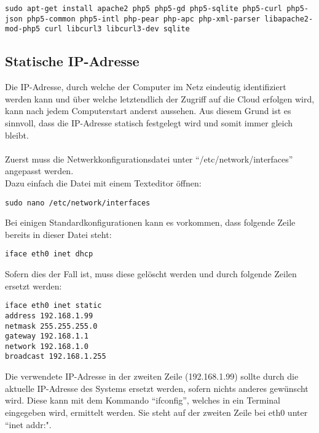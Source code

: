 \begin{lstlisting}
sudo apt-get install apache2 php5 php5-gd php5-sqlite php5-curl php5-json php5-common php5-intl php-pear php-apc php-xml-parser libapache2-mod-php5 curl libcurl3 libcurl3-dev sqlite
\end{lstlisting}

\subsection{Statische IP-Adresse}
Die IP-Adresse, durch welche der Computer im Netz eindeutig identifiziert werden kann und über welche letztendlich der Zugriff auf die Cloud erfolgen wird, kann nach jedem Computerstart anderst aussehen.
Aus diesem Grund ist es sinnvoll, dass die IP-Adresse statisch festgelegt wird und somit immer gleich bleibt.
\\
\\
Zuerst muss die Netwerkkonfigurationsdatei unter ``/etc/network/interfaces'' angepasst werden.
\\
Dazu einfach die Datei mit einem Texteditor öffnen:
\\

\begin{lstlisting}
sudo nano /etc/network/interfaces
\end{lstlisting} 

Bei einigen Standardkonfigurationen kann es vorkommen, dass folgende Zeile bereits in dieser Datei steht:

\begin{lstlisting}
iface eth0 inet dhcp
\end{lstlisting}

Sofern dies der Fall ist, muss diese gelöscht werden und durch folgende Zeilen ersetzt werden:
\\

\begin{lstlisting}
iface eth0 inet static
address 192.168.1.99
netmask 255.255.255.0
gateway 192.168.1.1
network 192.168.1.0
broadcast 192.168.1.255
\end{lstlisting}

Die verwendete IP-Adresse in der zweiten Zeile (192.168.1.99) sollte durch die aktuelle IP-Adresse des Systems ersetzt werden, sofern nichts anderes gewünscht wird. Diese kann mit dem Kommando ``ifconfig'', welches in ein Terminal eingegeben wird, ermittelt werden. Sie steht auf der zweiten Zeile bei eth0 unter ``inet addr:".
\\

